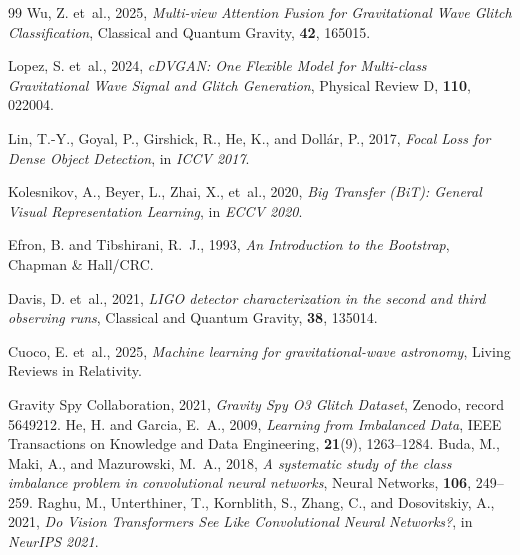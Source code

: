 \documentclass[12pt]{article}
\begin{document}
\begin{thebibliography}{99}
Wu, Z. et~al., 2025,
\emph{Multi-view Attention Fusion for Gravitational Wave Glitch Classification},
Classical and Quantum Gravity, \textbf{42}, 165015.

Lopez, S. et~al., 2024,
\emph{cDVGAN: One Flexible Model for Multi-class Gravitational Wave Signal and Glitch Generation},
Physical Review D, \textbf{110}, 022004.

Lin, T.-Y., Goyal, P., Girshick, R., He, K., and Doll{\'a}r, P., 2017,
\emph{Focal Loss for Dense Object Detection},
in \emph{ICCV 2017}.

Kolesnikov, A., Beyer, L., Zhai, X., et~al., 2020,
\emph{Big Transfer (BiT): General Visual Representation Learning},
in \emph{ECCV 2020}.

Efron, B. and Tibshirani, R.~J., 1993,
\emph{An Introduction to the Bootstrap},
Chapman \& Hall/CRC.

Davis, D. et~al., 2021,
\emph{LIGO detector characterization in the second and third observing runs},
Classical and Quantum Gravity, \textbf{38}, 135014.

Cuoco, E. et~al., 2025,
\emph{Machine learning for gravitational-wave astronomy},
Living Reviews in Relativity.

Gravity Spy Collaboration, 2021,
\emph{Gravity Spy O3 Glitch Dataset},
Zenodo, record 5649212.
He, H. and Garcia, E.~A., 2009,
\emph{Learning from Imbalanced Data},
IEEE Transactions on Knowledge and Data Engineering, \textbf{21}(9), 1263--1284.
Buda, M., Maki, A., and Mazurowski, M.~A., 2018,
\emph{A systematic study of the class imbalance problem in convolutional neural networks},
Neural Networks, \textbf{106}, 249--259.
Raghu, M., Unterthiner, T., Kornblith, S., Zhang, C., and Dosovitskiy, A., 2021,
\emph{Do Vision Transformers See Like Convolutional Neural Networks?},
in \emph{NeurIPS 2021}.

\end{thebibliography}
\end{document}
